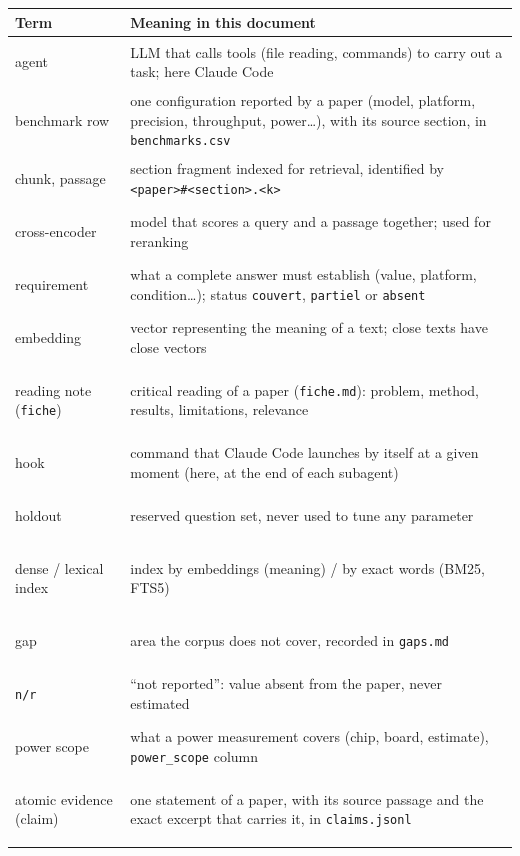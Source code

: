 \documentclass[11pt,a4paper]{article}
\newcommand{\cmd}[1]{\texttt{#1}}
\begin{document}
\begin{center}
\small
\begin{tabularx}{\linewidth}{@{}lL@{}}
\toprule
Term & Meaning in this document \\
\midrule
\hypertarget{gl:agent}{agent} & LLM that calls tools (file reading, commands) to carry out a task; here Claude Code \\
\hypertarget{gl:benchmark}{benchmark row} & one configuration reported by a paper (model, platform, precision, throughput, power\ldots), with its source section, in \cmd{benchmarks.csv} \\
\hypertarget{gl:passage}{chunk, passage} & section fragment indexed for retrieval, identified by \cmd{<paper>\#<section>.<k>} \\
\hypertarget{gl:crossenc}{cross-encoder} & model that scores a query and a passage together; used for reranking \\
\hypertarget{gl:exigence}{requirement} & what a complete answer must establish (value, platform, condition\ldots); status \cmd{couvert}, \cmd{partiel} or \cmd{absent} \\
\hypertarget{gl:embedding}{embedding} & vector representing the meaning of a text; close texts have close vectors \\
\hypertarget{gl:fiche}{reading note (\cmd{fiche})} & critical reading of a paper (\cmd{fiche.md}): problem, method, results, limitations, relevance \\
\hypertarget{gl:hook}{hook} & command that Claude Code launches by itself at a given moment (here, at the end of each subagent) \\
\hypertarget{gl:holdout}{holdout} & reserved question set, never used to tune any parameter \\
\hypertarget{gl:index}{dense / lexical index} & index by embeddings (meaning) / by exact words (BM25, FTS5) \\
\hypertarget{gl:gap}{gap} & area the corpus does not cover, recorded in \cmd{gaps.md} \\
\hypertarget{gl:nr}{\texttt{n/r}} & ``not reported'': value absent from the paper, never estimated \\
\hypertarget{gl:scope}{power scope} & what a power measurement covers (chip, board, estimate), \cmd{power\_scope} column \\
\hypertarget{gl:claim}{atomic evidence (claim)} & one statement of a paper, with its source passage and the exact excerpt that carries it, in \cmd{claims.jsonl} \\

\end{tabularx}
\end{center}
\end{document}
